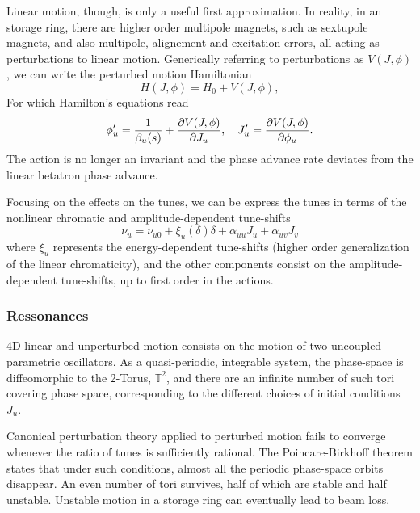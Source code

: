 Linear motion, though, is only a useful first approximation. In reality, in an storage ring, there are higher order multipole magnets, such as sextupole magnets, and also multipole, alignement and excitation errors, all acting as perturbations to linear motion. Generically referring to perturbations as $V(J, \phi)$, we can write the perturbed motion Hamiltonian
\begin{equation}
    H(J,\phi) =H_0 + V(J,\phi),
\end{equation}
For which Hamilton's equations read
\begin{equation}
\phi_u^\prime = \frac{1}{\beta_u(s)}+\pdv{V(J,\phi)}{J_u}, \quad J_u^\prime = \pdv{V(J,\phi)}{\phi_u}.
\end{equation}
The action is no longer an invariant and the phase advance rate deviates from the linear betatron phase advance.

Focusing on the effects on the tunes, we can be express the tunes in terms of the nonlinear chromatic and amplitude-dependent tune-shifts
\begin{equation}
    \nu_u = \nu_{u0} + \xi_u(\delta) \delta + \alpha_{uu} J_u + \alpha_{uv} J_v
\end{equation}
where $\xi_u$ represents the energy-dependent tune-shifts (higher order generalization of the linear chromaticity), and the other components consist on the amplitude-dependent tune-shifts, up to first order in the actions.


\subsubsection{Ressonances}
4D linear and unperturbed motion consists on the motion of two uncoupled parametric oscillators. As a quasi-periodic, integrable system, the phase-space is diffeomorphic to the 2-Torus, $\mathbb{T}^2$, and there are an infinite number of such tori covering phase space, corresponding to the different choices of initial conditions $J_u$.

Canonical perturbation theory applied to perturbed motion fails to converge whenever the ratio of tunes is sufficiently rational. The Poincare-Birkhoff theorem states that under such conditions, almost all the periodic phase-space orbits disappear. An even number of tori survives, half of which are stable and half unstable. Unstable motion in a storage ring can eventually lead to beam loss.

